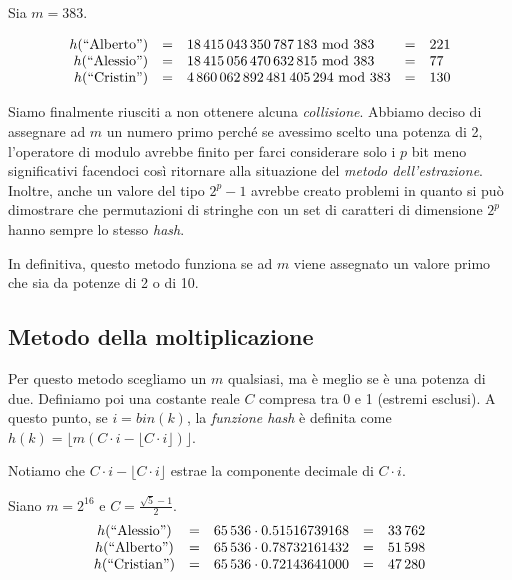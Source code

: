 \begin{eg}
    Sia $m=383$.

    \[\begin{array}[t]{rllcl}
        h(\text{``Alberto''}) & = & 18\,415\,043\,350\,787\,183\ \mathrm{mod}\ 383 & = & 221\\
        h(\text{``Alessio''}) & = & 18\,415\,056\,470\,632\,815\ \mathrm{mod}\ 383 & = & 77\\
        h(\text{``Cristin''}) & = & 4\,860\,062\,892\,481\,405\,294\ \mathrm{mod}\ 383 & = & 130
    \end{array}\]
\end{eg}\noindent
Siamo finalmente riusciti a non ottenere alcuna \emph{collisione}.
\newpage\noindent
Abbiamo deciso di assegnare ad $m$ un numero primo perché se avessimo scelto
una potenza di 2, l'operatore di modulo avrebbe finito per farci considerare solo
i $p$ bit meno significativi facendoci così ritornare alla situazione del
\emph{metodo dell'estrazione}. Inoltre, anche un valore del tipo $2^p-1$ avrebbe
creato problemi in quanto si può dimostrare che permutazioni di stringhe con un
set di caratteri di dimensione $2^p$ hanno sempre lo stesso \emph{hash}.

In definitiva, questo metodo funziona se ad $m$ viene assegnato un valore primo
che sia  da potenze di 2 o di 10.

\subsection{Metodo della moltiplicazione}
Per questo metodo scegliamo un $m$ qualsiasi, ma è meglio se è una potenza di due.
Definiamo poi una costante reale $C$ compresa tra 0 e 1 (estremi esclusi). A questo
punto, se $i=bin(k)$, la \emph{funzione hash} è definita come $h(k)=\lfloor m
(C\cdot i-\lfloor C\cdot i\rfloor)\rfloor$.

Notiamo che $C\cdot i-\lfloor C\cdot i\rfloor$ estrae la componente decimale di
$C\cdot i$.

\begin{eg}
    Siano $m=2^{16}$ e $C=\frac{\sqrt{5}-1}{2}$\footnotemark.
    \[\begin{array}[t]{ccccc}
        h(\text{``Alessio''}) & = & 65\,536\cdot0.51516739168 & = & 33\,762\\
        h(\text{``Alberto''}) & = & 65\,536\cdot0.78732161432 & = & 51\,598\\
        h(\text{``Cristian''}) & = & 65\,536\cdot0.72143641000 & = & 47\,280
    \end{array}\]
\end{eg}

